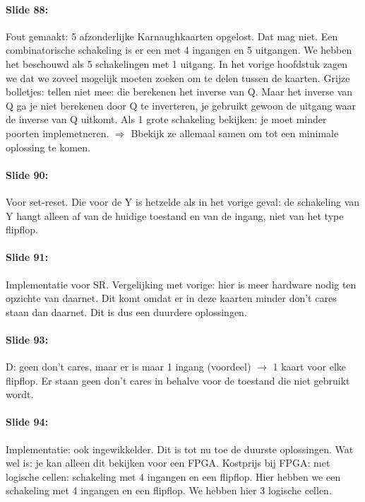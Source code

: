 \documentclass[10pt,a4paper]{book}
\begin{document}
\paragraph{Slide 88:} Fout gemaakt: 5 afzonderlijke Karnaughkaarten opgelost. Dat mag niet. Een combinatorische schakeling is er een met 4 ingangen en 5 uitgangen. We hebben het beschouwd als 5 schakelingen met 1 uitgang. In het vorige hoofdstuk zagen we dat we zoveel mogelijk moeten zoeken om te delen tussen de kaarten. Grijze bolletjes: tellen niet mee: die berekenen het inverse van Q. Maar het inverse van Q ga je niet berekenen door Q te inverteren, je gebruikt gewoon de uitgang waar de inverse van Q uitkomt.
Als 1 grote schakeling bekijken: je moet minder poorten implemetneren. $\Rightarrow$ Bbekijk ze allemaal samen om tot een minimale oplossing te komen. 

\paragraph{Slide 90:} Voor set-reset. Die voor de Y is hetzelde als in het vorige geval: de schakeling van Y hangt alleen af van de huidige toestand en van de ingang, niet van het type flipflop.

\paragraph{Slide 91:} Implementatie voor SR. Vergelijking met vorige: hier is meer hardware nodig ten opzichte van daarnet. Dit komt omdat er in deze kaarten minder don't cares staan dan daarnet. Dit is dus een duurdere oplossingen.

\paragraph{Slide 93:} D: geen don't cares, maar er is maar 1 ingang (voordeel) $\rightarrow$ 1 kaart voor elke flipflop. Er staan geen don't cares in behalve voor de toestand die niet gebruikt wordt.

\paragraph{Slide 94:} Implementatie: ook ingewikkelder. Dit is tot nu toe de duurste oplossingen. Wat wel is: je kan alleen dit bekijken voor een FPGA. Kostprijs bij FPGA: met logische cellen: schakeling met 4 ingangen en een flipflop. Hier hebben we een schakeling met 4 ingangen en een flipflop. We hebben hier 3 logische cellen.
\end{document}
